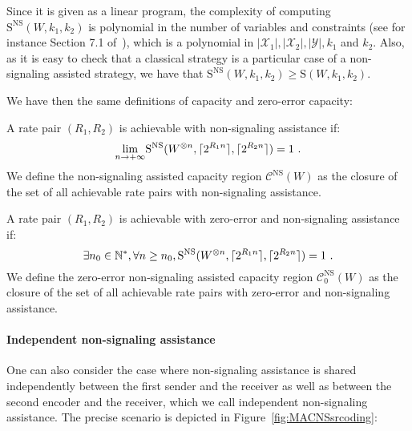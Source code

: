 Since it is given as a linear program, the complexity of computing $\mathrm{S}^{\mathrm{NS}}(W,k_1,k_2)$ is polynomial in the number of variables and constraints (see for instance Section 7.1 of~\cite{GM07}), which is a polynomial in $|\mathcal{X}_1|,|\mathcal{X}_2|,|\mathcal{Y}|,k_1$ and $k_2$. Also, as it is easy to check that a classical strategy is a particular case of a non-signaling assisted strategy, we have that $\mathrm{S}^{\mathrm{NS}}(W,k_1,k_2) \geq \mathrm{S}(W,k_1,k_2)$.

We have then the same definitions of capacity and zero-error capacity:
\begin{definition}
  A rate pair $(R_1,R_2)$ is achievable with non-signaling assistance if:
  \[ \underset{n \rightarrow +\infty}{\lim} \mathrm{S}^{\mathrm{NS}}(W^{\otimes n},\lceil2^{R_1n}\rceil,\lceil2^{R_2n}\rceil) = 1 \ . \]
  We define the non-signaling assisted capacity region $\mathcal{C}^{\mathrm{NS}}(W)$ as the closure of the set of all achievable rate pairs with non-signaling assistance.
\end{definition}

\begin{definition}
  A rate pair $(R_1,R_2)$ is achievable with zero-error and non-signaling assistance if:
  \[ \exists n_0 \in \mathbb{N}^*, \forall n \geq n_0, \mathrm{S}^{\mathrm{NS}}(W^{\otimes n},\lceil2^{R_1n}\rceil,\lceil2^{R_2n}\rceil) = 1 \ . \]
  We define the zero-error non-signaling assisted capacity region $\mathcal{C}^{\mathrm{NS}}_0(W)$ as the closure of the set of all achievable rate pairs with zero-error and non-signaling assistance.
\end{definition}

\paragraph{Independent non-signaling assistance} One can also consider the case where non-signaling assistance is shared independently between the first sender and the receiver as well as between the second encoder and the receiver, which we call independent non-signaling assistance. The precise scenario is depicted in Figure~\ref{fig:MACNSsrcoding}:

